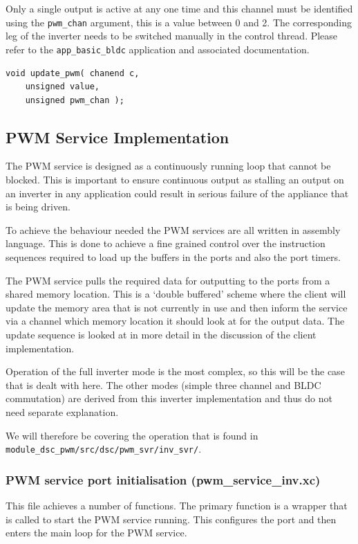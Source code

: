 Only a single output is active at any one time and this channel must be identified using the \verb=pwm_chan= argument, this is a value between 0 and 2. The corresponding leg of the inverter needs to be switched manually in the control thread. Please refer to the \verb=app_basic_bldc= application and associated documentation. 

\begin{lstlisting}
void update_pwm( chanend c, 
	unsigned value, 
	unsigned pwm_chan );
\end{lstlisting}

\subsection{PWM Service Implementation}
The PWM service is designed as a continuously running loop that cannot be blocked. This is important to ensure continuous output as stalling an output on an inverter in any application could result in serious failure of the appliance that is being driven.

To achieve the behaviour needed the PWM services are all written in assembly language. This is done to achieve a fine grained control over the instruction sequences required to load up the buffers in the ports and also the port timers.

The PWM service pulls the required data for outputting to the ports from a shared memory location. This is a `double buffered' scheme where the client will update the memory area that is not currently in use and then inform the service via a channel which memory location it should look at for the output data. The update sequence is looked at in more detail in the discussion of the client implementation.

Operation of the full inverter mode is the most complex, so this will be the case that is dealt with here. The other modes (simple three channel and BLDC commutation) are derived from this inverter implementation and thus do not need separate explanation.

We will therefore be covering the operation that is found in \newline \verb=module_dsc_pwm/src/dsc/pwm_svr/inv_svr/=. 

\subsubsection{PWM service port initialisation (pwm\_service\_inv.xc)}
This file achieves a number of functions. The primary function is a wrapper that is called to start the PWM service running. This configures the port and then enters the main loop for the PWM service.

